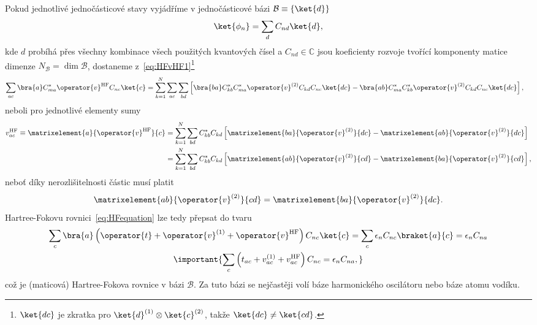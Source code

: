     Pokud jednotlivé jednočásticové stavy vyjádříme v jednočásticové bázi $\mathcal{B}\equiv\{\ket{d}\}$
    \begin{equation}
        \ket{\phi_{n}}=\sum_{d}C_{nd}\ket{d},
    \end{equation}
    kde $d$ probíhá přes všechny kombinace všech použitých kvantových čísel a $C_{nd}\in\mathbb{C}$ jsou koeficienty rozvoje tvořící komponenty matice dimenze $N_{\mathcal{B}}=\dim\mathcal{B}$, dostaneme z~\eqref{eq:HFvHF1}\footnote{
        $\ket{dc}$ je zkratka pro $\ket{d}^{(1)}\otimes\ket{c}^{(2)}$, takže $\ket{dc}\neq\ket{cd}$.
    }
    \begin{align}
        \sum_{ac}\bra{a}C_{ma}^{*}\operator{v}^{\text{HF}}C_{nc}\ket{c}
            &=\sum_{k=1}^{N}\sum_{ac}\sum_{bd}\left[\bra{ba}C_{kb}^{*}C_{ma}^{*}\operator{v}^{(2)}C_{kd}C_{nc}\ket{dc}
                -\bra{ab}C_{ma}^{*}C_{kb}^{*}\operator{v}^{(2)}C_{kd}C_{nc}\ket{dc}\right],
    \end{align}
    neboli pro jednotlivé elementy sumy
    \begin{align}
        v_{ac}^{\text{HF}}\equiv\matrixelement{a}{\operator{v}^{\text{HF}}}{c}
            &=\sum_{k=1}^{N}\sum_{bd}C_{kb}^{*}C_{kd}\left[\matrixelement{ba}{\operator{v}^{(2)}}{dc}-\matrixelement{ab}{\operator{v}^{(2)}}{dc}\right]\nonumber\\
            &=\sum_{k=1}^{N}\sum_{bd}C_{kb}^{*}C_{kd}\left[\matrixelement{ab}{\operator{v}^{(2)}}{cd}-\matrixelement{ba}{\operator{v}^{(2)}}{cd}\right],
        \label{eq:HFvHF}
    \end{align}
    neboť díky nerozlišitelnosti částic musí platit
    \begin{equation}
        \matrixelement{ab}{\operator{v}^{(2)}}{cd}=\matrixelement{ba}{\operator{v}^{(2)}}{dc}.
    \end{equation}
    Hartree-Fokovu rovnici~\eqref{eq:HFequation} lze tedy přepsat do tvaru
    \begin{gather}
        \sum_{c}\bra{a}\left(\operator{t}+\operator{v}^{(1)}+\operator{v}^{\text{HF}}\right)C_{nc}\ket{c}
            =\sum_{c}\epsilon_{n}C_{nc}\braket{a}{c}
            =\epsilon_{n}C_{na}\\
            \important{
                \sum_{c}\left(t_{ac}+v_{ac}^{(1)}+v_{ac}^{\text{HF}}\right)C_{nc}=\epsilon_{n}C_{na},
            }
        \label{eq:HFequationB}
    \end{gather}
    což je (maticová) Hartree-Fokova rovnice v bázi $\mathcal{B}$.
    Za tuto bázi se nejčastěji volí báze harmonického oscilátoru nebo báze atomu vodíku.
